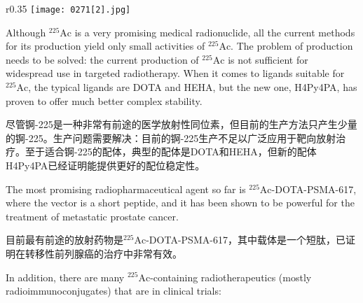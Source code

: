 \documentclass[dvipsnames, svgnames,a4paper,11pt]{article}
\begin{document}
\begin{wrapfigure}{r}{0.35\textwidth}
	\centering
    \texttt{[image: 0271[2].jpg]}  
     \label{fig367}
\end{wrapfigure}

Although \(\mathrm{^{225}Ac}\) is a very promising medical radionuclide, all the current methods for its production yield only small activities of \(\mathrm{^{225}Ac}\). The problem of production needs to be solved: the current production of \(\mathrm{^{225}Ac}\) is not sufficient for widespread use in targeted radiotherapy. When it comes to ligands suitable for \(\mathrm{^{225}Ac}\), the typical ligands are DOTA and HEHA, but the new one, H4Py4PA, has proven to offer much better complex stability.

尽管锕-225是一种非常有前途的医学放射性同位素，但目前的生产方法只产生少量的锕-225。生产问题需要解决：目前的锕-225生产不足以广泛应用于靶向放射治疗。至于适合锕-225的配体，典型的配体是DOTA和HEHA，但新的配体H4Py4PA已经证明能提供更好的配位稳定性。

The most promising radiopharmaceutical agent so far is \(\mathrm{^{225}Ac}\)-DOTA-PSMA-617, where the vector is a short peptide, and it has been shown to be powerful for the treatment of metastatic prostate cancer.

目前最有前途的放射药物是\(\mathrm{^{225}Ac}\)-DOTA-PSMA-617，其中载体是一个短肽，已证明在转移性前列腺癌的治疗中非常有效。

In addition, there are many \(\mathrm{^{225}Ac}\)-containing radiotherapeutics (mostly radioimmunoconjugates) that are in clinical trials:
\end{document}
